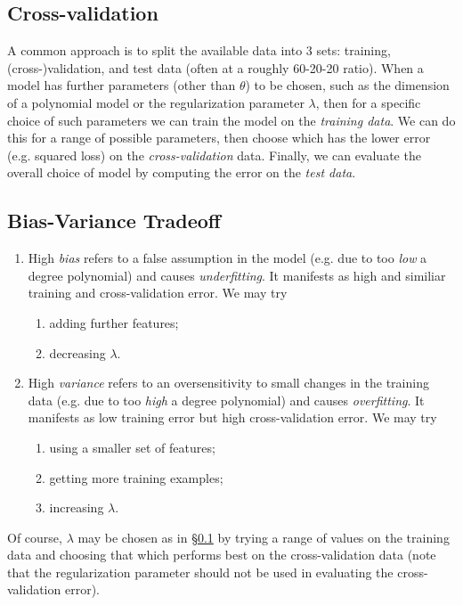 \documentclass[a4paper,12pt]{article}
\theoremstyle{definition}
\begin{document}
\subsection{Cross-validation}
\label{cross-validation}
A common approach is to split the available data into 3 sets: training, (cross-)validation, and test data (often at a roughly 60-20-20 ratio). When a model has further parameters (other than $\theta$) to be chosen, such as the dimension of a polynomial model or the regularization parameter $\lambda$, then for a specific choice of such parameters we can train the model on the \emph{training data}. We can do this for a range of possible parameters, then choose which has the lower error (e.g. squared loss) on the \emph{cross-validation} data. Finally, we can evaluate the overall choice of model by computing the error on the \emph{test data}.

\subsection{Bias-Variance Tradeoff}
\begin{enumerate}
\item High \emph{bias} refers to a false assumption in the model (e.g. due to too \emph{low} a degree polynomial) and causes \emph{underfitting}. It manifests as high and similiar training and cross-validation error. We may try
\begin{enumerate}[label=(\alph*)]
\item adding further features;
\item decreasing $\lambda$.
\end{enumerate}
\item High \emph{variance} refers to an oversensitivity to small changes in the training data (e.g. due to too \emph{high} a degree polynomial) and causes \emph{overfitting}. It manifests as low training error but high cross-validation error. We may try 
\begin{enumerate}[label=(\alph*)]
\item using a smaller set of features;
\item getting more training examples;
\item increasing $\lambda$.
\end{enumerate}
\end{enumerate}

Of course, $\lambda$ may be chosen as in \S\ref{cross-validation} by trying a range of values on the training data and choosing that which performs best on the cross-validation data (note that the regularization parameter should not be used in evaluating the cross-validation error).
\end{document}
